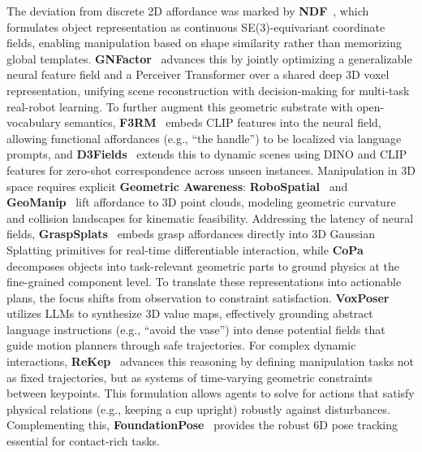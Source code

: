 \documentclass[acmsmall,screen,review,anonymous]{acmart}
\begin{document}
The deviation from discrete 2D affordance was marked by \textbf{NDF}~\cite{simeonov2021ndf}, which formulates object representation as continuous SE(3)-equivariant coordinate fields, enabling manipulation based on shape similarity rather than memorizing global templates. \textbf{GNFactor}~\cite{ze2023gnfactor} advances this by jointly optimizing a generalizable neural feature field and a Perceiver Transformer over a shared deep 3D voxel representation, unifying scene reconstruction with decision-making for multi-task real-robot learning. To further augment this geometric substrate with open-vocabulary semantics, \textbf{F3RM}~\cite{f3rm2023} embeds CLIP features into the neural field, allowing functional affordances (e.g., ``the handle'') to be localized via language prompts, and \textbf{D3Fields}~\cite{wang2024d3fields} extends this to dynamic scenes using DINO and CLIP features for zero-shot correspondence across unseen instances. Manipulation in 3D space requires explicit \textbf{Geometric Awareness}: \textbf{RoboSpatial}~\cite{robospatial2025} and \textbf{GeoManip}~\cite{geomanip2025} lift affordance to 3D point clouds, modeling geometric curvature and collision landscapes for kinematic feasibility. Addressing the latency of neural fields, \textbf{GraspSplats}~\cite{graspsplats2025} embeds grasp affordances directly into 3D Gaussian Splatting primitives for real-time differentiable interaction, while \textbf{CoPa}~\cite{copa2024} decomposes objects into task-relevant geometric parts to ground physics at the fine-grained component level.
To translate these representations into actionable plans, the focus shifts from observation to constraint satisfaction. \textbf{VoxPoser}~\cite{voxposer2023} utilizes LLMs to synthesize 3D value maps, effectively grounding abstract language instructions (e.g., ``avoid the vase'') into dense potential fields that guide motion planners through safe trajectories. For complex dynamic interactions, \textbf{ReKep}~\cite{rekep2024} advances this reasoning by defining manipulation tasks not as fixed trajectories, but as systems of time-varying geometric constraints between keypoints. This formulation allows agents to solve for actions that satisfy physical relations (e.g., keeping a cup upright) robustly against disturbances. Complementing this, \textbf{FoundationPose}~\cite{wen2024foundationpose} provides the robust 6D pose tracking essential for contact-rich tasks.
\end{document}

